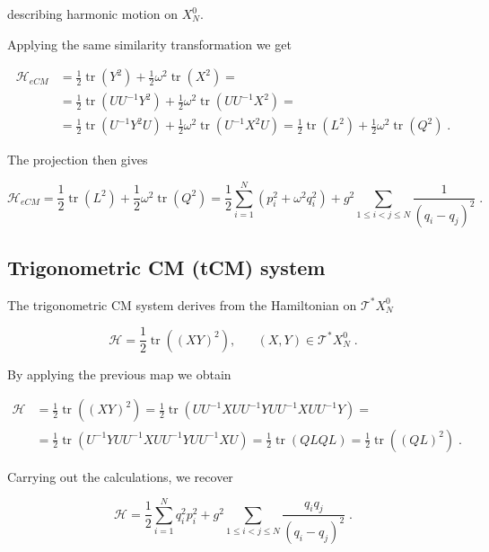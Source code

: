 describing harmonic motion on $X^0_N$.

Applying the same similarity transformation we get

\begin{equation}
\begin{split}
    \mathcal{H}_{eCM} &= \frac{1}{2}\operatorname{tr}(Y^2) + \frac{1}{2}\omega^2 \operatorname{tr}(X^2) = \\  &= \frac{1}{2}\operatorname{tr}(UU^{-1}Y^2) + \frac{1}{2}\omega^2 \operatorname{tr}(UU^{-1} X^2) = \\ 
    & = \frac{1}{2}\operatorname{tr}(U^{-1} Y^2 U) + \frac{1}{2}\omega^2 \operatorname{tr}(U^{-1} X^2 U)= \frac{1}{2}\operatorname{tr}(L^2) + \frac{1}{2}\omega^2 \operatorname{tr}(Q^2)\;.
\end{split}
\end{equation}

The projection then gives
    
\begin{equation}
    \mathcal{H}_{eCM} = \frac{1}{2}\operatorname{tr}(L^2) + \frac{1}{2}\omega^2 \operatorname{tr}(Q^2)= \frac{1}{2}\sum_{i=1}^N (p_i^2 + \omega^2 q_i^2) + g^2 \sum_{1 \leq i < j \leq N} \frac{1}{(q_i - q_j)^2}\;.
\end{equation}


\subsection{Trigonometric CM (tCM) system}
The trigonometric CM system derives from the Hamiltonian on $\mathcal{T}^\ast X^0_N$

\begin{equation}
    \mathcal{H} = \frac{1}{2}\operatorname{tr}((XY)^2), \;\;\;\;\;\;(X,Y) \in \mathcal{T}^\ast X^0_N\;.
\end{equation}

By applying the previous map we obtain

\begin{align*}
\mathcal{H} &= \frac{1}{2}\operatorname{tr}((XY)^2)=\frac{1}{2}\operatorname{tr}(UU^{-1}XUU^{-1}YUU^{-1}XUU^{-1}Y) = \\
&= \frac{1}{2}\operatorname{tr}(U^{-1}YUU^{-1}XUU^{-1}YUU^{-1}XU) = \frac{1}{2}\operatorname{tr}(QLQL) = \frac{1}{2}\operatorname{tr}((QL)^2)\;.
\end{align*}

Carrying out the calculations, we recover

\begin{equation}
\mathcal{H} = \frac{1}{2} \sum_{i=1}^N q_i^2 p_i^2 + g^2 \sum_{1 \leq i < j \leq N} \frac{q_i q_j}{(q_i - q_j)^2}\;.
\end{equation}

